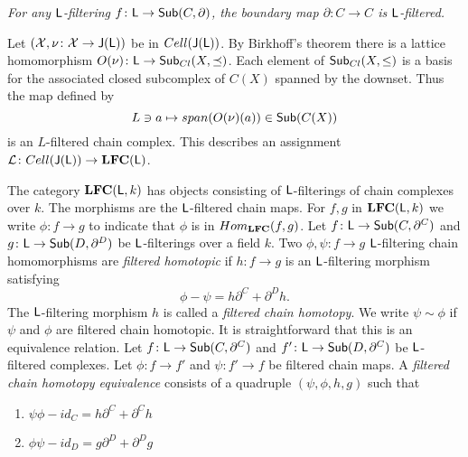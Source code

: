\begin{ex}
{\em
For any ${\mathsf L}$-filtering $f\colon {\mathsf L} \to \mathsf{Sub}(C,\partial)$,
the boundary map $\partial\colon C\to C$ is ${\mathsf L}$-filtered.
}
\end{ex}

\begin{ex}
{\em

Let $({\mathcal X},\nu\colon {\mathcal X}\to{\mathsf J}({\mathsf L}))$ be in $Cell({\mathsf J}({\mathsf L}))$.  By Birkhoff's theorem there is a lattice homomorphism $O(\nu)\colon {\mathsf L}\to \mathsf{Sub}_{Cl}(X,\preceq)$.  Each element of $\mathsf{Sub}_{Cl}(X,\leq)$ is a basis for the associated closed subcomplex of $C(X)$ spanned by the downset.   Thus the map defined by $$L\ni a\mapsto span(O(\nu)(a))\in \mathsf{Sub}(C(X))$$ is an $L$-filtered chain complex.  This describes an assignment ${\mathcal L}\colon Cell({\mathsf J}({\mathsf L}))\to {\bf LFC}({\mathsf L})$.


 
}
\end{ex}






The category ${\bf LFC}({\mathsf L},k)$ has objects consisting of ${\mathsf L}$-filterings of chain complexes over $k$.  The morphisms are the ${\mathsf L}$-filtered chain maps.  For $f,g$ in ${\bf LFC}({\mathsf L},k)$ we write $\phi\colon f\to g$ to indicate that $\phi$ is in $Hom_{{\bf LFC}}(f,g)$.   Let $f \colon {\mathsf L}\to \mathsf{Sub}(C,\partial^C)$ and $g \colon {\mathsf L}\to \mathsf{Sub}(D,\partial^D)$ be ${\mathsf L}$-filterings over a field $k$.  
Two $\phi,\psi \colon f\to g$  ${\mathsf L}$-filtering chain homomorphisms are {\em filtered homotopic} if $h\colon f\to g$ is an ${\mathsf L}$-filtering morphism satisfying
\[
\phi -\psi = h\partial^C+\partial^Dh.
\]
The ${\mathsf L}$-filtering morphism $h$ is called a {\em filtered chain homotopy}.  
We write $\psi\sim \phi$ if $\psi$ and $\phi$ are filtered chain homotopic.  
It is straightforward that this is an equivalence relation.    Let $f \colon {\mathsf L}\to \mathsf{Sub}(C,\partial^C)$ and $f' \colon {\mathsf L}\to \mathsf{Sub}(D,\partial^C)$ be ${\mathsf L}$-filtered complexes.  
Let $\phi \colon f\to f'$ and $\psi \colon f'\to f$ be filtered chain maps.  
A {\em filtered chain homotopy equivalence} consists of a quadruple $(\psi,\phi,h,g)$ such that 
\begin{enumerate}
\item $\psi\phi-id_C= h \partial^C + \partial^C h$
\item $\phi\psi-id_D = g \partial^D+\partial^D g$
\end{enumerate}



